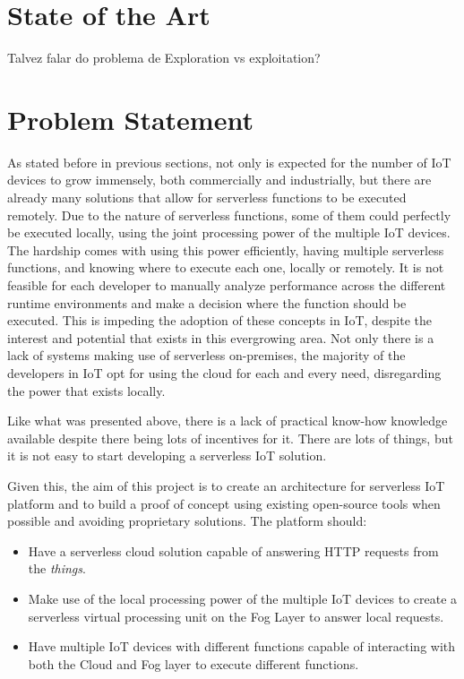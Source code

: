 \documentclass[conference]{IEEEtran}
\begin{document}
\section{State of the Art}

Talvez falar do problema de Exploration vs exploitation?

\section{Problem Statement}

As stated before in previous sections, not only is expected for the number of IoT
devices to grow immensely, both commercially and industrially, but there are
already many solutions that allow for serverless functions to be executed
remotely. Due to the nature of serverless functions, some of them could perfectly
be executed locally, using the joint processing power of the multiple IoT devices.
The hardship comes with using this power efficiently, having multiple serverless
functions, and knowing where to execute each one, locally or remotely. It is not
feasible for each developer to manually analyze performance across the different
runtime environments and make a decision where the function should be executed.
This is impeding the adoption of these concepts in IoT, despite the interest and
potential that exists in this evergrowing area. Not only there is a lack of
systems making use of serverless on-premises, the majority of the developers in
IoT opt for using the cloud for each and every need, disregarding the power that
exists locally.

Like what was presented above, there is a lack of practical know-how knowledge
available despite there being lots of incentives for it. There are lots of things,
but it is not easy to start developing a serverless IoT solution.

Given this, the aim of this project is to create an architecture for serverless IoT
platform and to build a proof of concept using existing open-source tools when
possible and avoiding proprietary solutions. The platform should:
\begin{itemize}
    \item Have a serverless cloud solution capable of answering HTTP requests from
        the \textit{things}.
    \item Make use of the local processing power of the multiple IoT devices to
        create a serverless virtual processing unit on the Fog Layer to answer local requests.
    \item Have multiple IoT devices with different functions capable of
        interacting with both the Cloud and Fog layer to execute different functions. 
\end{itemize}
\end{document}
